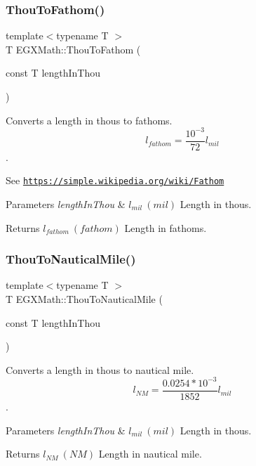 \subsubsection{\texorpdfstring{Thou\+To\+Fathom()}{ThouToFathom()}}
{\footnotesize\ttfamily template$<$typename T $>$ \\
T E\+G\+X\+Math\+::\+Thou\+To\+Fathom (\begin{DoxyParamCaption}\item[{const T}]{length\+In\+Thou }\end{DoxyParamCaption})}



Converts a length in thous to fathoms. \[ l_{fathom}= \frac{10^{-3}}{72} l_{mil} \]. 

See \href{https://simple.wikipedia.org/wiki/Fathom}{\tt https\+://simple.\+wikipedia.\+org/wiki/\+Fathom} 
\begin{DoxyParams}{Parameters}
{\em length\+In\+Thou} & $ l_{mil}\ (mil)$ Length in thous. \\
\hline
\end{DoxyParams}
\begin{DoxyReturn}{Returns}
$ l_{fathom}\ (fathom)$ Length in fathoms. 
\end{DoxyReturn}
\mbox{\label{group___e_g_x_math-_conversions-_length_conversions-_imperial-_thou-_nautical_gadd6e063edb182d6461d6c35f4070072d}} 
\subsubsection{\texorpdfstring{Thou\+To\+Nautical\+Mile()}{ThouToNauticalMile()}}
{\footnotesize\ttfamily template$<$typename T $>$ \\
T E\+G\+X\+Math\+::\+Thou\+To\+Nautical\+Mile (\begin{DoxyParamCaption}\item[{const T}]{length\+In\+Thou }\end{DoxyParamCaption})}



Converts a length in thous to nautical mile. \[ l_{NM}= \frac{0.0254 * 10^{-3}}{1852} l_{mil} \]. 


\begin{DoxyParams}{Parameters}
{\em length\+In\+Thou} & $ l_{mil}\ (mil)$ Length in thous. \\
\hline
\end{DoxyParams}
\begin{DoxyReturn}{Returns}
$ l_{NM}\ (NM)$ Length in nautical mile. 
\end{DoxyReturn}

